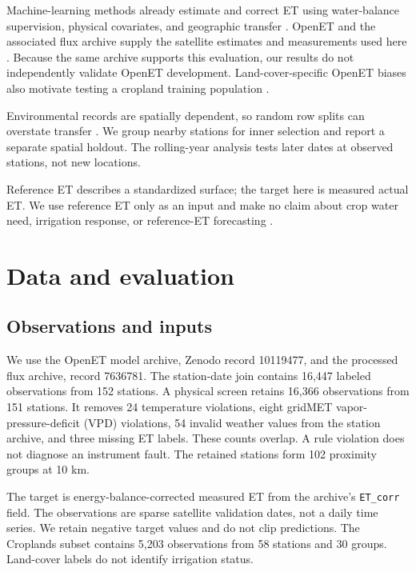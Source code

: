 \documentclass[10pt,letterpaper]{article}
\begin{document}
Machine-learning methods already estimate and correct ET using water-balance supervision, physical covariates, and geographic transfer \citep{hascoet2022,rozanov2025,shi2025,residual2026,wei2026}.
OpenET and the associated flux archive supply the satellite estimates and measurements used here \citep{volk2024,openetdata,fluxdata}.
Because the same archive supports this evaluation, our results do not independently validate OpenET development.
Land-cover-specific OpenET biases also motivate testing a cropland training population \citep{openetissues}.

Environmental records are spatially dependent, so random row splits can overstate transfer \citep{roberts2017}.
We group nearby stations for inner selection and report a separate spatial holdout.
The rolling-year analysis tests later dates at observed stations, not new locations.

Reference ET describes a standardized surface; the target here is measured actual ET.
We use reference ET only as an input and make no claim about crop water need, irrigation response, or reference-ET forecasting \citep{kukal2026}.

\section{Data and evaluation}
\subsection{Observations and inputs}
We use the OpenET model archive, Zenodo record 10119477, and the processed flux archive, record 7636781.
The station-date join contains 16,447 labeled observations from 152 stations.
A physical screen retains 16,366 observations from 151 stations.
It removes 24 temperature violations, eight gridMET vapor-pressure-deficit (VPD) violations, 54 invalid weather values from the station archive, and three missing ET labels.
These counts overlap.
A rule violation does not diagnose an instrument fault.
The retained stations form 102 proximity groups at 10 km.

The target is energy-balance-corrected measured ET from the archive's \texttt{ET\_corr} field.
The observations are sparse satellite validation dates, not a daily time series.
We retain negative target values and do not clip predictions.
The Croplands subset contains 5,203 observations from 58 stations and 30 groups.
Land-cover labels do not identify irrigation status.
\end{document}
